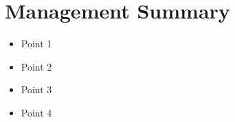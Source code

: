 \chapter{Management Summary} \label{ch1}
\begin{itemize}
	\item Point 1 
	\item Point 2
	\item Point 3
	\item Point 4
\end{itemize}

